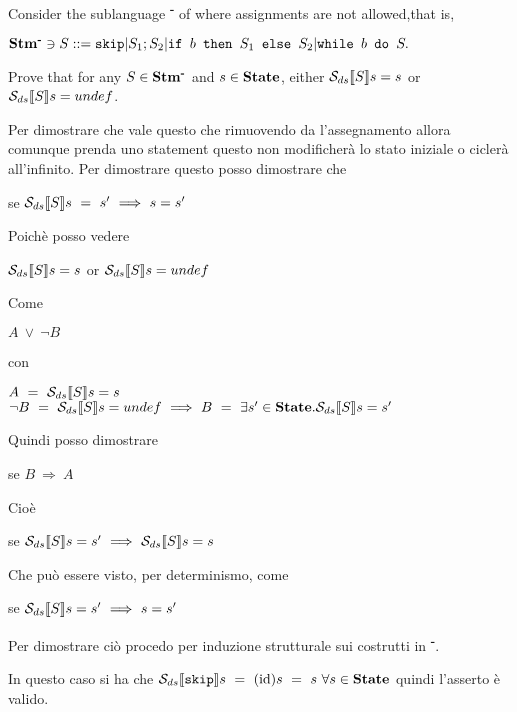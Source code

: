 \newcommand{\stmminus}{\stm{}\textsuperscript{\textbf{-}}}

{
    Consider the sublanguage \stmminus{} of \stm{} where assignments are not allowed,that is,
    \begin{center}
    $\stmminus{} \ni{} S ::= \skipistr | S_1;S_2 | \ifABC{b}{S_1}{S_2} | \wbS{b}{S}.$
    \end{center}
    Prove that for any $S\in\stmminus{}$ and $s\in\mbox{\textbf{State}}$, either $\mathcal{S}_{ds}\llbracket S \rrbracket{}s=s$ or $\mathcal{S}_{ds}\llbracket S \rrbracket{}s=undef$.
}
{
    Per dimostrare che vale questo che rimuovendo da \stm{} l'assegnamento
    allora comunque prenda uno statement questo non modificherà lo stato
    iniziale o ciclerà all'infinito. Per dimostrare questo posso dimostrare che 
    \begin{center}
    se $\mathcal{S}_{ds}\llbracket S \rrbracket{}s~=~s'~\Longrightarrow~s=s'$
    \end{center} 
    Poichè posso vedere 
    \begin{center}
    $\mathcal{S}_{ds}\llbracket S \rrbracket{}s=s$ or $\mathcal{S}_{ds}\llbracket S \rrbracket{}s=undef$
    \end{center}
    Come
    \begin{center}
    $A~\lor~\neg{}B$
    \end{center}
    con
    \begin{center}
    $A~=~\mathcal{S}_{ds}\llbracket S \rrbracket{}s=s$\\
    $\neg{}B~=~\mathcal{S}_{ds}\llbracket S \rrbracket{}s=undef~\Longrightarrow~
    B~=~\exists{}s'\in\mbox{\textbf{State}}.\mathcal{S}_{ds}\llbracket S \rrbracket{}s=s'$
    \end{center}
    Quindi posso dimostrare
    \begin{center}
    se $B~\Longrightarrow~A$
    \end{center}
    Cioè
    \begin{center}
    se $\mathcal{S}_{ds}\llbracket S \rrbracket{}s=s'~\Longrightarrow~\mathcal{S}_{ds}\llbracket S \rrbracket{}s=s$
    \end{center}
    Che può essere visto, per determinismo, come
    \begin{center}
    se $\mathcal{S}_{ds}\llbracket S \rrbracket{}s=s'~\Longrightarrow~s=s'$
    \end{center}
    Per dimostrare ciò procedo per induzione strutturale sui costrutti in 
    \stmminus{}.


     In questo caso si ha che $\mathcal{S}_{ds}\llbracket \textrm{\normalfont{\texttt{skip}}} \rrbracket s~
    =~(\textrm{\normalfont{id}})s~=~s~\forall{}s\in\mbox{\textbf{State}}$ quindi l'asserto è valido.

}
